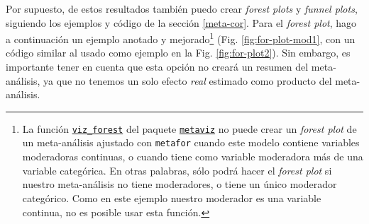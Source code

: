 \documentclass[
  bookmarksnumbered]{article}
\begin{document}
Por supuesto, de estos resultados también puedo crear \emph{forest plots} y \emph{funnel plots}, siguiendo los ejemplos y código de la sección \ref{meta-cor}. Para el \emph{forest plot}, hago a continuación un ejemplo anotado y mejorado\footnote{La función \href{https://cran.r-project.org/web/packages/metaviz/vignettes/metaviz.html\#creating-forest-plots-with-function-viz_forest}{\texttt{viz\_forest}} del paquete \href{https://cran.r-project.org/web/packages/metaviz/vignettes/metaviz.html}{\texttt{metaviz}} no puede crear un \emph{forest plot} de un meta-análisis ajustado con \texttt{metafor} cuando este modelo contiene variables moderadoras continuas, o cuando tiene como variable moderadora más de una variable categórica. En otras palabras, sólo podrá hacer el \emph{forest plot} si nuestro meta-análisis no tiene moderadores, o tiene un único moderador categórico. Como en este ejemplo nuestro moderador es una variable continua, no es posible usar esta función.} (Fig. \ref{fig:for-plot-mod1}, con un código similar al usado como ejemplo en la Fig. \ref{fig:for-plot2}). Sin embargo, es importante tener en cuenta que esta opción no creará un resumen del meta-análisis, ya que no tenemos un solo efecto \emph{real} estimado como producto del meta-análisis.
\end{document}
